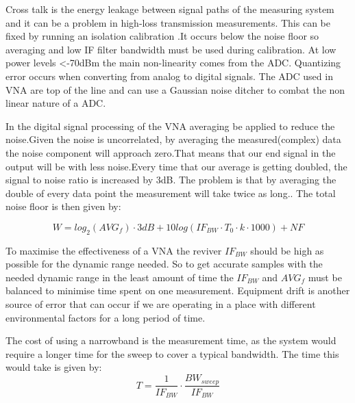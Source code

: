 Cross talk is the energy leakage between signal paths of the measuring system and it can be a problem in high-loss transmission measurements. This can be fixed by running an isolation calibration \citep{crosstalk}.It occurs below the noise floor so averaging and low \gls{IF} filter bandwidth must be used during calibration.
At low power levels <-70dBm the main non-linearity comes from the \gls{ADC}. Quantizing error occurs when converting from analog to digital signals. The \gls{ADC} used in \gls{VNA} are top of the line and can use a Gaussian noise ditcher to combat the non linear nature of a \gls{ADC}. 


In the digital signal processing of the \gls{VNA} averaging be applied to reduce the noise.Given the noise is uncorrelated, by averaging the measured(complex) data the noise component will approach zero.That means that our end signal in the output will be with less noise.Every time that our average is getting doubled, the signal to noise ratio is increased by 3dB. The problem is that by averaging the double of every data point the measurement will take twice as long.\citep{KeysightAVG}. The total noise floor is then given by:

\begin{equation}
W = log_{2}(AVG_f)\cdot 3dB +10log(IF_{BW}\cdot T_{0}\cdot k\cdot 1000) + NF 
\label{NFwithAVG}
\end{equation}

\begin{where}
\end{where}


To maximise the effectiveness of a \gls{VNA} the reviver $IF_{BW}$ should be high as possible for the dynamic range needed. So to get accurate samples with the needed dynamic range in the least amount of time the $IF_{BW}$ and $AVG_f$ must be balanced to minimise time spent on one measurement.
Equipment drift is another source of error that can occur if we are operating in a place with different environmental factors for a long period of time.

The cost of using a narrowband is the measurement time, as the system would require a longer time for the sweep to cover a typical bandwidth. The time this would take is given by:
\begin{equation}
T = \frac{1}{IF_{BW}} \cdot \frac{BW_{sweep}}{IF_{BW}}
\end{equation}

